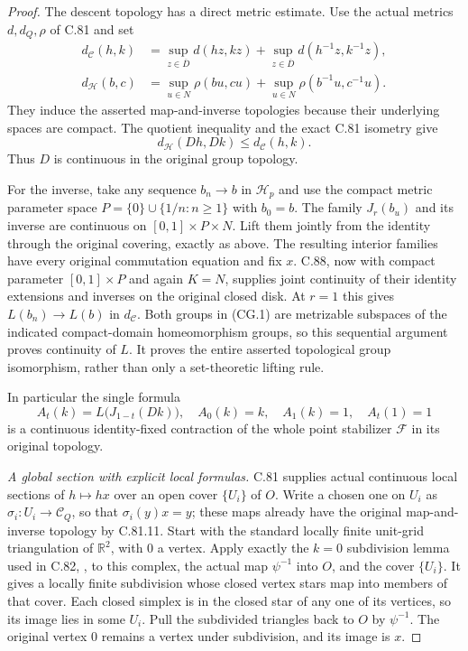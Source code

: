 \begin{proof}
The descent topology has a direct metric estimate.
Use the actual metrics $d,d_Q,\rho$ of C.81 and set
\[
 \begin{aligned}
 d_{\mathscr C}(h,k)
   &=\sup_{z\in\overline D}d(hz,kz)
      +\sup_{z\in\overline D}d(h^{-1}z,k^{-1}z),\\
 d_{\mathscr H}(b,c)
   &=\sup_{u\in N}\rho(bu,cu)
      +\sup_{u\in N}\rho(b^{-1}u,c^{-1}u).
 \end{aligned}
\]
They induce the asserted map-and-inverse topologies
because their underlying spaces are compact.
The quotient inequality and the exact C.81 isometry give
\[
                 d_{\mathscr H}(Dh,Dk)
                       \leq d_{\mathscr C}(h,k).              \tag{CG.10}
\]
Thus $D$ is continuous in the original group topology.

For the inverse, take any sequence $b_n\to b$ in
$\mathscr H_p$ and use the compact metric parameter space
$P=\{0\}\cup\{1/n:n\geq1\}$ with $b_0=b$.
The family $J_r(b_u)$ and its inverse are continuous
on $[0,1]\times P\times N$.
Lift them jointly from the identity through the original
covering, exactly as above.  The resulting interior
families have every original commutation equation and
fix $x$.  C.88, now with compact parameter
$[0,1]\times P$ and again $K=N$, supplies joint
continuity of their identity extensions and inverses
on the original closed disk.  At $r=1$ this gives
$L(b_n)\to L(b)$ in $d_{\mathscr C}$.
Both groups in (CG.1) are metrizable subspaces of
the indicated compact-domain homeomorphism groups,
so this sequential argument proves continuity of $L$.
It proves the entire asserted topological group
isomorphism, rather than only a set-theoretic lifting rule.

In particular the single formula
\[
 A_t(k)=L\bigl(J_{1-t}(Dk)\bigr),
 \quad A_0(k)=k,\quad A_1(k)=1,\quad A_t(1)=1                \tag{CG.11}
\]
is a continuous identity-fixed contraction of the whole
point stabilizer $\mathscr F$ in its original topology.

\emph{A global section with explicit local formulas.}
C.81 supplies actual continuous local sections of
$h\mapsto hx$ over an open cover $\{U_i\}$ of $O$.
Write a chosen one on $U_i$ as
$\sigma_i:U_i\to\mathscr C_Q$, so that
$\sigma_i(y)x=y$; these maps already have the original
map-and-inverse topology by C.81.11.
Start with the standard locally finite unit-grid
triangulation of $\mathbb R^2$, with $0$ a vertex.
Apply exactly the $k=0$ subdivision lemma used in C.82,
\cite[Lemma~1, p.~458]{C_Haver1975}, to this complex,
the actual map $\psi^{-1}$ into $O$, and the cover
$\{U_i\}$.  It gives a locally finite subdivision
whose closed vertex stars map into members of that
cover.  Each closed simplex is in the closed star
of any one of its vertices, so its image lies in
some $U_i$.  Pull the subdivided triangles back to
$O$ by $\psi^{-1}$.  The original vertex $0$ remains
a vertex under subdivision, and its image is $x$.


\end{proof}
